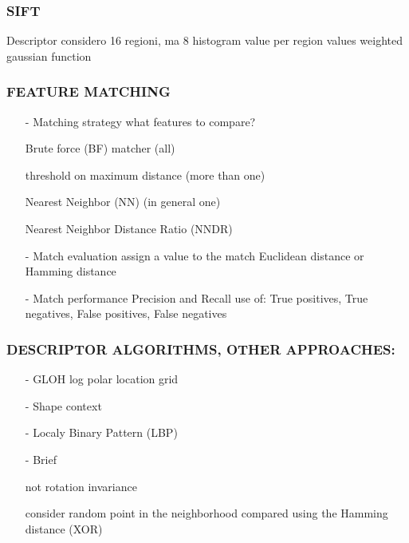 \documentclass[11pt,english]{article}
\begin{document}
\subsubsection*{SIFT}
Descriptor \makebox[0.5cm]{\textrightarrow} considero 16 regioni, ma 8 histogram value per region \makebox[0.5cm]{\textrightarrow} values weighted gaussian function


\subsubsection*{FEATURE MATCHING}
\begin{itemize}
    \item[-] Matching strategy \makebox[0.5cm]{\textrightarrow} what features to compare? \par
    \makebox[3.5cm]{\textrightarrow} Brute force (BF) matcher (all)\par
    \makebox[3.5cm]{\textrightarrow} threshold on maximum distance (more than one)\par
    \makebox[3.5cm]{\textrightarrow} Nearest Neighbor (NN) (in general one)\par
    \makebox[3.5cm]{\textrightarrow} Nearest Neighbor Distance Ratio (NNDR)\par
    \item[-] Match evaluation \makebox[0.5cm]{\textrightarrow} assign a value to the match \makebox[0.5cm]{\textrightarrow} Euclidean distance or Hamming distance
    \item[-] Match performance \makebox[0.5cm]{\textrightarrow} Precision and Recall \makebox[0.5cm]{\textrightarrow} use of:	 True positives, True negatives, False positives, False negatives
\end{itemize}
 


\subsubsection*{DESCRIPTOR ALGORITHMS, OTHER APPROACHES:}

\begin{itemize}
    \item[-] GLOH \makebox[0.5cm]{\textrightarrow} log polar location grid
    \item[-] Shape context
    \item[-] Localy Binary Pattern (LBP)
    \item[-] Brief \par
    \makebox[1.0cm]{\textrightarrow} not rotation invariance \par
    \makebox[1.0cm]{\textrightarrow} consider random point in the neighborhood \makebox[0.5cm]{\textrightarrow} compared using the Hamming distance (XOR)\par
\end{itemize}
\end{document}
